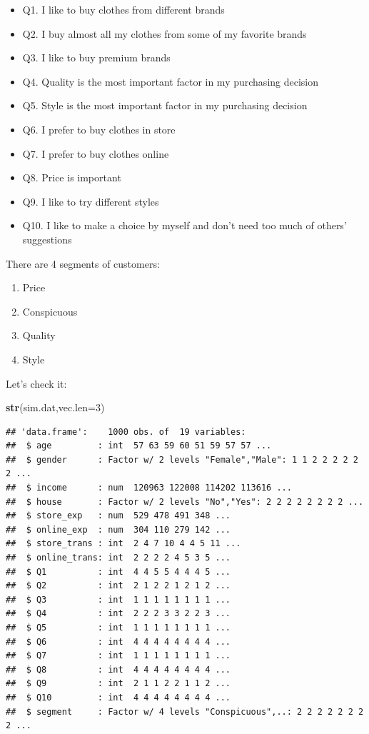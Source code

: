 \documentclass[12pt,]{krantz}
\newenvironment{Shaded}{\begin{snugshade}}{\end{snugshade}}
\newcommand{\KeywordTok}[1]{\textcolor[rgb]{0.13,0.29,0.53}{\textbf{#1}}}
\newcommand{\DataTypeTok}[1]{\textcolor[rgb]{0.13,0.29,0.53}{#1}}
\newcommand{\DecValTok}[1]{\textcolor[rgb]{0.00,0.00,0.81}{#1}}
\newcommand{\NormalTok}[1]{#1}
\providecommand{\tightlist}{%
  \setlength{\itemsep}{0pt}\setlength{\parskip}{0pt}}
\theoremstyle{definition}
\theoremstyle{definition}
\theoremstyle{definition}
\theoremstyle{remark}
\begin{document}
\begin{itemize}
\tightlist
\item
  Q1. I like to buy clothes from different brands
\item
  Q2. I buy almost all my clothes from some of my favorite brands
\item
  Q3. I like to buy premium brands
\item
  Q4. Quality is the most important factor in my purchasing decision
\item
  Q5. Style is the most important factor in my purchasing decision
\item
  Q6. I prefer to buy clothes in store
\item
  Q7. I prefer to buy clothes online
\item
  Q8. Price is important
\item
  Q9. I like to try different styles
\item
  Q10. I like to make a choice by myself and don't need too much of
  others' suggestions
\end{itemize}

There are 4 segments of customers:

\begin{enumerate}
\def\labelenumi{\arabic{enumi}.}
\tightlist
\item
  Price
\item
  Conspicuous
\item
  Quality
\item
  Style
\end{enumerate}

Let's check it:

\begin{Shaded}
\begin{Highlighting}[]
\KeywordTok{str}\NormalTok{(sim.dat,}\DataTypeTok{vec.len=}\DecValTok{3}\NormalTok{)}
\end{Highlighting}
\end{Shaded}

\begin{verbatim}
## 'data.frame':    1000 obs. of  19 variables:
##  $ age         : int  57 63 59 60 51 59 57 57 ...
##  $ gender      : Factor w/ 2 levels "Female","Male": 1 1 2 2 2 2 2 2 ...
##  $ income      : num  120963 122008 114202 113616 ...
##  $ house       : Factor w/ 2 levels "No","Yes": 2 2 2 2 2 2 2 2 ...
##  $ store_exp   : num  529 478 491 348 ...
##  $ online_exp  : num  304 110 279 142 ...
##  $ store_trans : int  2 4 7 10 4 4 5 11 ...
##  $ online_trans: int  2 2 2 2 4 5 3 5 ...
##  $ Q1          : int  4 4 5 5 4 4 4 5 ...
##  $ Q2          : int  2 1 2 2 1 2 1 2 ...
##  $ Q3          : int  1 1 1 1 1 1 1 1 ...
##  $ Q4          : int  2 2 2 3 3 2 2 3 ...
##  $ Q5          : int  1 1 1 1 1 1 1 1 ...
##  $ Q6          : int  4 4 4 4 4 4 4 4 ...
##  $ Q7          : int  1 1 1 1 1 1 1 1 ...
##  $ Q8          : int  4 4 4 4 4 4 4 4 ...
##  $ Q9          : int  2 1 1 2 2 1 1 2 ...
##  $ Q10         : int  4 4 4 4 4 4 4 4 ...
##  $ segment     : Factor w/ 4 levels "Conspicuous",..: 2 2 2 2 2 2 2 2 ...
\end{verbatim}
\end{document}
